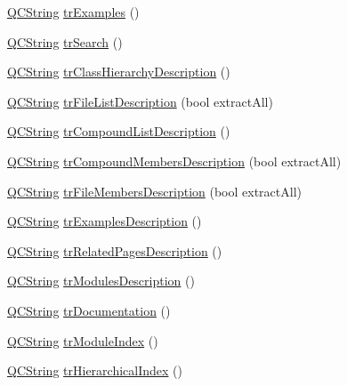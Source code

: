 \begin{DoxyCompactItemize}
\item 
\mbox{\hyperlink{class_q_c_string}{Q\+C\+String}} \mbox{\hyperlink{class_translator_italian_ae87f35c3c0d43ba328a32fa20058b4c3}{tr\+Examples}} ()
\item 
\mbox{\hyperlink{class_q_c_string}{Q\+C\+String}} \mbox{\hyperlink{class_translator_italian_a401d42c1892e95d150e4f7a05bb0ebd7}{tr\+Search}} ()
\item 
\mbox{\hyperlink{class_q_c_string}{Q\+C\+String}} \mbox{\hyperlink{class_translator_italian_aac8a9a87c149343a78fef579c2593c2b}{tr\+Class\+Hierarchy\+Description}} ()
\item 
\mbox{\hyperlink{class_q_c_string}{Q\+C\+String}} \mbox{\hyperlink{class_translator_italian_a45a60ace4c396d01f11b05cde17b6449}{tr\+File\+List\+Description}} (bool extract\+All)
\item 
\mbox{\hyperlink{class_q_c_string}{Q\+C\+String}} \mbox{\hyperlink{class_translator_italian_a13ed3a773e9431d421de580180031617}{tr\+Compound\+List\+Description}} ()
\item 
\mbox{\hyperlink{class_q_c_string}{Q\+C\+String}} \mbox{\hyperlink{class_translator_italian_a646ca9abeadb7dc736ae08b00789a5a7}{tr\+Compound\+Members\+Description}} (bool extract\+All)
\item 
\mbox{\hyperlink{class_q_c_string}{Q\+C\+String}} \mbox{\hyperlink{class_translator_italian_a090c735a3b7b71fbf12ef69ce137cfa5}{tr\+File\+Members\+Description}} (bool extract\+All)
\item 
\mbox{\hyperlink{class_q_c_string}{Q\+C\+String}} \mbox{\hyperlink{class_translator_italian_a0d2bdf692fbe641b56c0ddb85e5cf882}{tr\+Examples\+Description}} ()
\item 
\mbox{\hyperlink{class_q_c_string}{Q\+C\+String}} \mbox{\hyperlink{class_translator_italian_a1c40ed15d41b40441b59617f03c6b8ed}{tr\+Related\+Pages\+Description}} ()
\item 
\mbox{\hyperlink{class_q_c_string}{Q\+C\+String}} \mbox{\hyperlink{class_translator_italian_ac376bb383b9b382bbd768e838c9d94e8}{tr\+Modules\+Description}} ()
\item 
\mbox{\hyperlink{class_q_c_string}{Q\+C\+String}} \mbox{\hyperlink{class_translator_italian_a0859d9fbdb1e3aff98d59224e0c641da}{tr\+Documentation}} ()
\item 
\mbox{\hyperlink{class_q_c_string}{Q\+C\+String}} \mbox{\hyperlink{class_translator_italian_ad75cbe5e77bf89cbea9f2363363d72f7}{tr\+Module\+Index}} ()
\item 
\mbox{\hyperlink{class_q_c_string}{Q\+C\+String}} \mbox{\hyperlink{class_translator_italian_ad0e07313efe09f47ed07d179e9cd6627}{tr\+Hierarchical\+Index}} ()

\end{DoxyCompactItemize}
